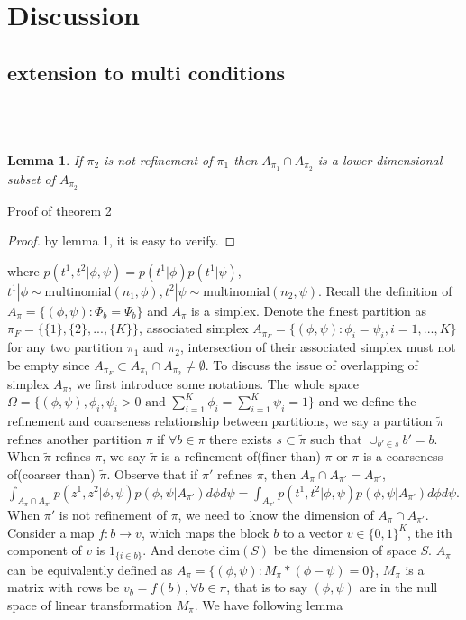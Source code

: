 \documentclass[11pt]{amsart}
\newtheorem{lemma}{Lemma}
\begin{document}
\section{Discussion}
\subsection{extension to multi conditions}


\newpage
\appendix
\section{}
\hfill\\
\begin{lemma}
If $\pi_2$ is not refinement of $\pi_1$ then $A_{\pi_1} \cap A_{\pi_2}$ is a lower dimensional subset of $A_{\pi_2}$
\end{lemma}
Proof of theorem 2
\begin{proof}
by lemma 1, it is easy to verify.
\end{proof}
where $p(t^1,t^2|\phi,\psi) = p(t^1|\phi)p(t^1|\psi)$, $t^1|\phi \sim \text{multinomial}(n_1, \phi), t^2|\psi \sim \text{multinomial}(n_2, \psi)$. Recall the definition of $A_\pi = \{(\phi,\psi): \Phi_b = \Psi_b\}$ and $A_\pi$ is a simplex. Denote the finest partition as $\pi_{F} = \{ \{1\}, \{2\},...,\{K\}\}$, associated simplex $A_{\pi_{F}} = \{(\phi, \psi): \phi_i = \psi_i, i = 1,...,K\}$ for any two partition $\pi_1$ and $\pi_2$, intersection of their associated simplex must not be empty since $A_{\pi_{F}}\subset A_{\pi_1}\cap A_{\pi_2} \neq \emptyset$.  To discuss the issue of overlapping of simplex $A_\pi$, we first introduce some notations. The whole space $\Omega = \{ (\phi,\psi), \phi_i,\psi_i > 0 \text{ and } \sum_{i=1}^K \phi_i = \sum_{i=1}^K \psi_i = 1\}$ and we define the refinement and coarseness relationship between partitions, we say a partition $\tilde{\pi}$ refines another partition $\pi$ if $\forall b \in \pi$ there exists $s \subset \tilde{\pi}$  such that $\cup_{b'\in s} b' = b$. When $\tilde{\pi}$ refines $\pi$, we say $\tilde{\pi}$ is a refinement of(finer than) $\pi$ or $\pi$ is a coarseness of(coarser than) $\tilde{\pi}$. 
Observe that if $\pi'$ refines $\pi$, then $A_\pi \cap A_{\pi'} = A_{\pi'}$, $\int_{A_\pi\cap A_{\pi'}} p(z^1,z^2|\phi,\psi)p(\phi, \psi | A_{\pi'})d\phi d\psi = \int_{A_{\pi'}} p(t^1,t^2|\phi,\psi)p(\phi, \psi | A_{\pi'})d\phi d\psi $. When $\pi'$ is not refinement of $\pi$, we need to know the dimension of $A_\pi\cap A_{\pi'}$. Consider a map $f: b \rightarrow v$, which maps the block $b$ to a vector $v\in \{0, 1\}^K$, the ith component of $v$ is $1_{\{i\in b\}}$. And denote $\text{dim}(S)$ be the dimension of space $S$. $A_\pi$ can be equivalently defined as $A_\pi =  \{(\phi,\psi): M_\pi * (\phi - \psi) = 0\}$, $M_\pi$ is a matrix with rows be $v_b = f(b), \forall b\in \pi$, that is to say $(\phi,\psi)$ are in the null space of linear transformation $M_\pi$.  We have following lemma\\
\end{document}
